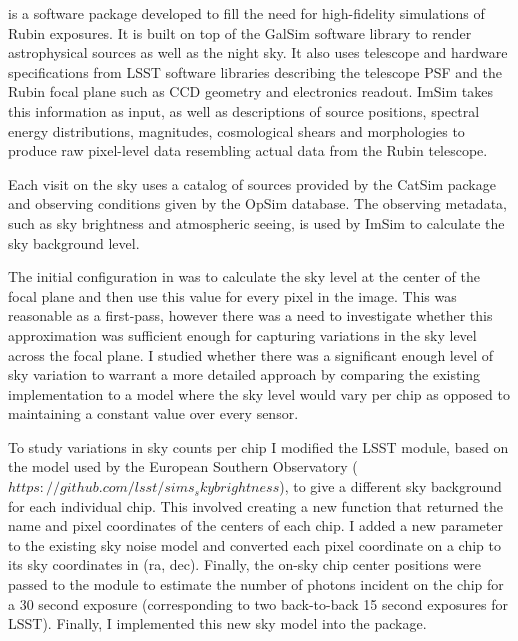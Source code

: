  is a software package developed to fill the need for high-fidelity simulations of Rubin exposures. It is built on top of the GalSim software library to render astrophysical sources as well as the night sky. It also uses telescope and hardware specifications from LSST software libraries describing the telescope PSF and the Rubin focal plane such as CCD geometry and electronics readout. ImSim takes this information as input, as well as descriptions of source positions, spectral energy distributions, magnitudes, cosmological shears and morphologies to produce raw pixel-level data resembling actual data from the Rubin telescope.


Each visit on the sky uses a catalog of sources provided by the CatSim package and observing conditions given by the OpSim database. The observing metadata, such as sky brightness and atmospheric seeing, is used by ImSim to calculate the sky background level. 

The initial configuration in  was to calculate the sky level at the center of the focal plane and then use this value for every pixel in the image. This was reasonable as a first-pass, however there was a need to investigate whether this approximation was sufficient enough for capturing variations in the sky level across the focal plane. I studied whether there was a significant enough level of sky variation to warrant a more detailed approach by comparing the existing implementation to a model where the sky level would vary per chip as opposed to maintaining a constant value over every sensor.

To study variations in sky counts per chip I modified the LSST  module, based on the model used by the European Southern Observatory ($https://github.com/lsst/sims_skybrightness$), to give a different sky background for each individual chip. This involved creating a new function that returned the name and pixel coordinates of the centers of each chip. I added a new  parameter to the existing sky noise model and converted each pixel coordinate on a chip to its sky coordinates in (ra, dec). Finally, the on-sky chip center positions were passed to the  module to estimate the number of photons incident on the chip for a 30 second exposure (corresponding to two back-to-back 15 second exposures for LSST). Finally, I implemented this new sky model into the  package.

